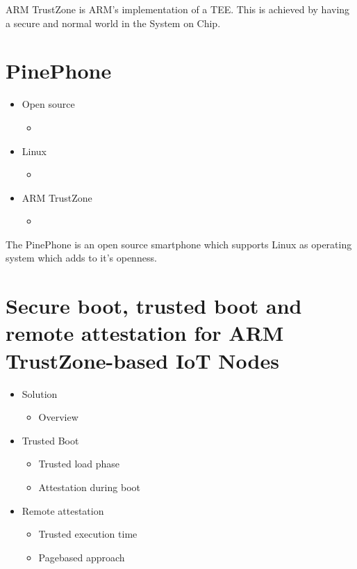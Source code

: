 \documentclass{report}
\begin{document}
ARM TrustZone is ARM's implementation of a TEE. This is achieved by having a secure and normal world in the System on Chip.

\section{PinePhone}

\begin{itemize}
\item Open source \begin{itemize}
\item
\end{itemize}
\item Linux \begin{itemize}
\item
\end{itemize}
\item ARM TrustZone \begin{itemize}
\item
\end{itemize}
\end{itemize}

The PinePhone is an open source smartphone which supports Linux as operating system which adds to it's openness.

\section{Secure boot, trusted boot and remote attestation for ARM TrustZone-based IoT Nodes}

\begin{itemize}
\item Solution \begin{itemize}
\item Overview
\end{itemize}
\item Trusted Boot \begin{itemize}
\item Trusted load phase
\item Attestation during boot
\end{itemize}
\item Remote attestation \begin{itemize}
\item Trusted execution time
\item Pagebased approach
\end{itemize}
\end{itemize}
\end{document}
